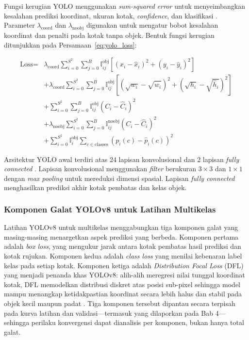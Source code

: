 Fungsi kerugian YOLO menggunakan \textit{sum-squared error} untuk
menyeimbangkan kesalahan prediksi koordinat, ukuran kotak,
\textit{confidence}, dan klasifikasi \cite{redmon2016you}. Parameter
$\lambda_{\text{coord}}$ dan $\lambda_{\text{noobj}}$ digunakan untuk
mengatur bobot kesalahan koordinat dan penalti pada kotak tanpa objek. Bentuk
fungsi kerugian ditunjukkan pada Persamaan~\ref{eq:yolo_loss}:

\begin{equation}
\label{eq:yolo_loss}
\begin{split} \text{Loss} = & \lambda_{\text{coord}} \sum_{i=0}^{S^2} \sum_{j=0}^{B} \mathbb{I}_{ij}^{\text{obj}} \left[ (x_i - \hat{x}_i)^2 + (y_i - \hat{y}_i)^2 \right] \\ & + \lambda_{\text{coord}} \sum_{i=0}^{S^2} \sum_{j=0}^{B} \mathbb{I}_{ij}^{\text{obj}} \left[ (\sqrt{w_i} - \sqrt{\hat{w}_i})^2 + (\sqrt{h_i} - \sqrt{\hat{h}_i})^2 \right] \\ & + \sum_{i=0}^{S^2} \sum_{j=0}^{B} \mathbb{I}_{ij}^{\text{obj}} (C_i - \hat{C}_i)^2 \\ & + \lambda_{\text{noobj}} \sum_{i=0}^{S^2} \sum_{j=0}^{B} \mathbb{I}_{ij}^{\text{noobj}} (C_i - \hat{C}_i)^2 \\ & + \sum_{i=0}^{S^2} \mathbb{I}_{i}^{\text{obj}} \sum_{c \in \text{classes}} (p_i(c) - \hat{p}_i(c))^2
\end{split}
\end{equation}

Arsitektur YOLO awal terdiri atas 24 lapisan konvolusional dan 2 lapisan
\textit{fully connected} \cite{redmon2016you}. Lapisan konvolusional
menggunakan \textit{filter} berukuran $3 \times 3$ dan $1 \times 1$ dengan
\textit{max pooling} untuk mereduksi dimensi spasial. Lapisan
\textit{fully connected} menghasilkan prediksi akhir kotak pembatas dan kelas
objek.

\subsubsection{Komponen Galat YOLOv8 untuk Latihan Multikelas}

Latihan YOLOv8 untuk multikelas menggabungkan tiga komponen galat yang masing-masing menargetkan aspek prediksi yang berbeda. Komponen pertama adalah \textit{box loss}, yang mengukur jarak antara kotak pembatas hasil prediksi dan kotak rujukan. Komponen kedua adalah \textit{class loss} yang menilai kebenaran label kelas pada setiap kotak. Komponen ketiga adalah \textit{Distribution Focal Loss} (DFL) yang menjadi penanda khas YOLOv8: alih-alih meregresi nilai tunggal koordinat kotak, DFL memodelkan distribusi diskret atas posisi sub-pixel sehingga model mampu menangkap ketidakpastian koordinat secara lebih halus dan stabil pada objek kecil maupun padat \cite{yaseen2024yolov8indepthexplorationinternal}. Tiga komponen tersebut dipantau secara terpisah pada kurva latihan dan validasi---termasuk yang dilaporkan pada Bab 4---sehingga perilaku konvergensi dapat dianalisis per komponen, bukan hanya total galat.


